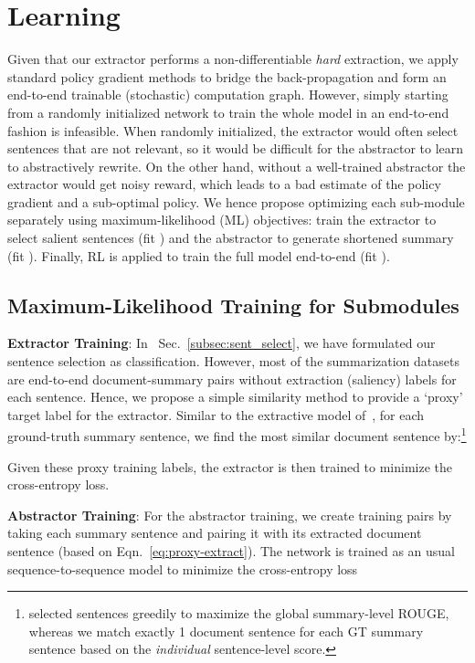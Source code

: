 \documentclass[11pt,a4paper]{article}
\def\secref#1{Sec.~\ref{#1}}
\def\eqnref#1{Eqn.~\ref{#1}}
\begin{document}
 

\section{Learning}
Given that our extractor performs a non-differentiable \emph{hard} extraction, 
we apply standard policy gradient methods to bridge the back-propagation and form an end-to-end trainable (stochastic) computation graph.
However, simply starting from a randomly initialized network to train the whole model in an end-to-end fashion is infeasible. 
When randomly initialized, the extractor would often select sentences that are not relevant,
so it would be difficult for the abstractor to learn to abstractively rewrite.
On the other hand, without a well-trained abstractor the extractor would get noisy reward, which leads to a bad estimate of the policy gradient and a sub-optimal policy.
We hence propose optimizing each sub-module separately using maximum-likelihood (ML) objectives: 
train the extractor to select salient sentences (fit ) and the abstractor to generate shortened summary (fit ).
Finally, RL is applied to train the full model end-to-end (fit ).

\subsection{Maximum-Likelihood Training for Submodules}

\noindent\textbf{Extractor Training}: In ~\secref{subsec:sent_select}, we have formulated our sentence selection as classification. 
However, most of the summarization datasets are end-to-end document-summary pairs without extraction (saliency) labels for each sentence.
Hence, we propose a simple similarity method to provide a `proxy' target label for the extractor. Similar to the extractive model of~, for each ground-truth summary sentence, we find the most similar document sentence  by:\footnote{ 
selected sentences greedily to maximize the global summary-level ROUGE, whereas we match exactly 1 document sentence for each GT summary sentence based on the \textit{individual} sentence-level score.}
\vspace{-5pt}

Given these proxy training labels, the extractor is then trained to minimize the cross-entropy loss.

\noindent\textbf{Abstractor Training}: For the abstractor training, we create training pairs by taking each summary sentence and pairing it with its extracted document sentence (based on \eqnref{eq:proxy-extract}). The network is trained as an usual sequence-to-sequence model to minimize 
the cross-entropy loss
\end{document}
